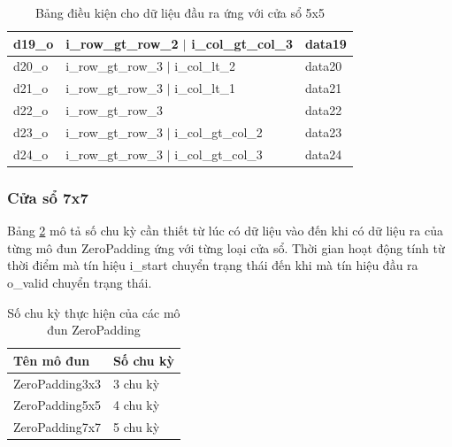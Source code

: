 \begin{table}[!ht]
\begin{tabular}{|p{2.2cm} p{7cm} p{4cm}|}
      d19\_o & i\_row\_gt\_row\_2 $\vert$ i\_col\_gt\_col\_3 & data19 \\ \hline
      d20\_o & i\_row\_gt\_row\_3 $\vert$ i\_col\_lt\_2     & data20 \\ \hline
      d21\_o & i\_row\_gt\_row\_3 $\vert$ i\_col\_lt\_1     & data21 \\ \hline
      d22\_o & i\_row\_gt\_row\_3                           & data22 \\ \hline
      d23\_o & i\_row\_gt\_row\_3 $\vert$ i\_col\_gt\_col\_2 & data23 \\ \hline
      d24\_o & i\_row\_gt\_row\_3 $\vert$ i\_col\_gt\_col\_3 & data24 \\ \hline
    \end{tabular}
    \caption{Bảng điều kiện cho dữ liệu đầu ra ứng với cửa sổ 5x5}
    \label{tab:conditionForOutputZero5x5}
\end{table}

\newpage
\subsubsection{Cửa sổ 7x7}
Bảng \ref{tab:numberOfCycleZeroPadding} mô tả số chu kỳ cần thiết từ lúc có dữ liệu vào đến khi có dữ liệu ra của từng mô đun ZeroPadding ứng với từng loại cửa sổ. Thời gian hoạt động tính từ thời điểm mà tín hiệu i\_start chuyển trạng thái đến khi mà tín hiệu đầu ra o\_valid chuyển trạng thái.
\begin{table}[H]
	\centering
	\renewcommand{\arraystretch}{1.3}
	\begin{tabular}{|p{5cm} p{5cm} |}
		\hline
		\rowcolor{gray!30}
		\textbf{Tên mô đun} & \textbf{Số chu kỳ}  \\
		\hline
		ZeroPadding3x3  & 3 chu kỳ
		\\ \hline
		ZeroPadding5x5 & 4 chu kỳ
		\\ \hline
		ZeroPadding7x7 & 5 chu kỳ
		\\ \hline
	\end{tabular}
	\caption{Số chu kỳ thực hiện của các mô đun ZeroPadding}
	\label{tab:numberOfCycleZeroPadding}
\end{table}


